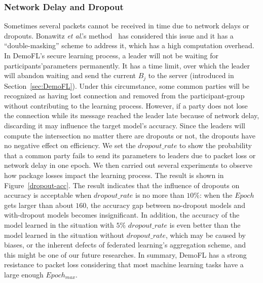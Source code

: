 \subsubsection{Network Delay and Dropout}
Sometimes several packets cannot be received in time due to network delays or dropouts. Bonawitz \emph{et al}.'s method~\cite{Practical} has considered this issue and it has a ``double-masking'' scheme to address it, which has a high computation overhead. In DemoFL's secure learning process, a leader will not be waiting for participants'parameters permanently. It has a time limit, over which the leader will abandon waiting and send the current $B_j$ to the server (introduced in Section~\ref{sec:DemoFL}). Under this circumstance, some common parties will be recognized as having lost connection and removed from the participant-group without contributing to the learning process. However, if a party does not lose the connection while its message reached the leader late because of network delay, discarding it may influence the target model's accuracy. Since the leaders will compute the intersection no matter there are dropouts or not, the dropouts have no negative effect on efficiency. We set the $dropout\_rate$ to show the probability that a common party fails to send its parameters to leaders due to packet loss or network delay in one epoch. We then carried out several experiments to observe how package losses impact the learning process. The result is shown in Figure~\ref{dropout-acc}. The result indicates that the influence of dropouts on accuracy is acceptable when $dropout\_rate$ is no more than $10\%$: when the $Epoch$ gets larger than about $160$, the accuracy gap between no-dropout models and with-dropout models becomes insignificant. In addition, the accuracy of the model learned in the situation with $5\%$ $dropout\_rate$ is even better than the model learned in the situation without $dropout\_rate$,  which may be caused by biases, or the inherent defects of federated learning's aggregation scheme, and this might be one of our future researches. In summary, DemoFL has a strong resistance to packet loss considering that most machine learning tasks have a large enough $Epoch_{max}$.
